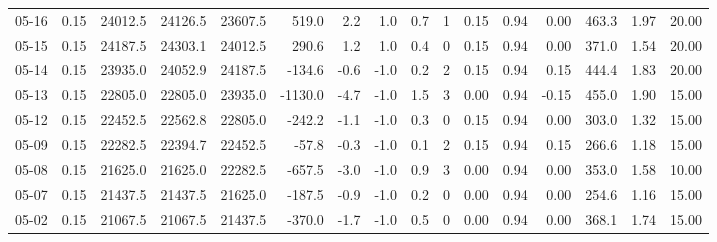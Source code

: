 \begin{threeparttable}
{\begin{tabular}{lrrrrrrrrrrrrrrr}
  05-16 &     0.15 & 24012.5 & 24126.5 & 23607.5 &      519.0 &            2.2 &                      1.0 &                 0.7 &              1 &       0.15 &      0.94 &           0.00 &            463.3 &            1.97 &                  20.00 \\
  05-15 &     0.15 & 24187.5 & 24303.1 & 24012.5 &      290.6 &            1.2 &                      1.0 &                 0.4 &              0 &       0.15 &      0.94 &           0.00 &            371.0 &            1.54 &                  20.00 \\
  05-14 &     0.15 & 23935.0 & 24052.9 & 24187.5 &     -134.6 &           -0.6 &                     -1.0 &                 0.2 &              2 &       0.15 &      0.94 &           0.15 &            444.4 &            1.83 &                  20.00 \\
  05-13 &     0.15 & 22805.0 & 22805.0 & 23935.0 &    -1130.0 &           -4.7 &                     -1.0 &                 1.5 &              3 &       0.00 &      0.94 &          -0.15 &            455.0 &            1.90 &                  15.00 \\
  05-12 &     0.15 & 22452.5 & 22562.8 & 22805.0 &     -242.2 &           -1.1 &                     -1.0 &                 0.3 &              0 &       0.15 &      0.94 &           0.00 &            303.0 &            1.32 &                  15.00 \\
  05-09 &     0.15 & 22282.5 & 22394.7 & 22452.5 &      -57.8 &           -0.3 &                     -1.0 &                 0.1 &              2 &       0.15 &      0.94 &           0.15 &            266.6 &            1.18 &                  15.00 \\
  05-08 &     0.15 & 21625.0 & 21625.0 & 22282.5 &     -657.5 &           -3.0 &                     -1.0 &                 0.9 &              3 &       0.00 &      0.94 &           0.00 &            353.0 &            1.58 &                  10.00 \\
  05-07 &     0.15 & 21437.5 & 21437.5 & 21625.0 &     -187.5 &           -0.9 &                     -1.0 &                 0.2 &              0 &       0.00 &      0.94 &           0.00 &            254.6 &            1.16 &                  15.00 \\
  05-02 &     0.15 & 21067.5 & 21067.5 & 21437.5 &     -370.0 &           -1.7 &                     -1.0 &                 0.5 &              0 &       0.00 &      0.94 &           0.00 &            368.1 &            1.74 &                  15.00 \\

\end{tabular}}
\end{threeparttable}
